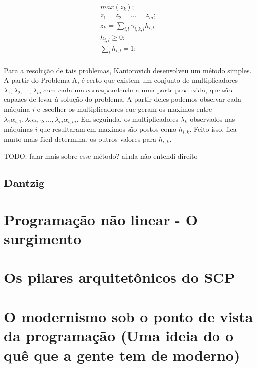 \begin{align}
  max(z_k); \\
  z_1 = z_2 = ... = z_m; \\
  z_k = \sum_{i, l} \gamma_{i, k, l} h_{i, l} \\
  h_{i, l} \geq 0; \\
  \sum_l h_{i, l} = 1; \\
\end{align}


Para a resolução de tais problemas, Kantorovich desenvolveu um método simples. A partir do
Problema A, é certo que existem um conjunto de multiplicadores \( \lambda_1, \lambda_2, ..., \lambda_m \) com
cada um correspondendo a uma parte produzida, que são capazes de levar à solução do problema.
A partir deles podemos observar cada máquina \(i\) e escolher os multiplicadores que geram os
maximos entre \( \lambda_1\alpha_{i, 1}, \lambda_2\alpha_{i, 2}, ..., \lambda_m\alpha_{i, m} \). Em seguinda, os multiplicadores \( \lambda_k \)
observados nas máquinas \(i\) que resultaram em maximos são postos como \(h_{i, k}\). Feito isso,
fica muito mais fácil determinar os outros valores para \( h_{i, k} \).

TODO: falar mais sobre esse método? ainda não entendi direito


\subsection{Dantzig}

\section{Programação não linear - O surgimento}
\section{Os pilares arquitetônicos do SCP}
\section{O modernismo sob o ponto de vista da programação (Uma ideia do o quê que a gente tem de moderno)}
